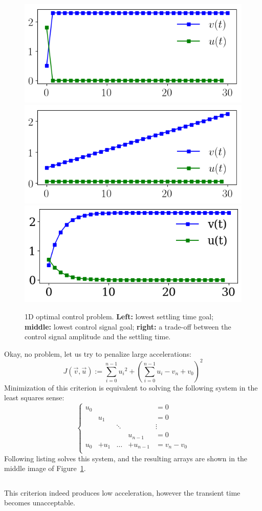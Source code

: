 \documentclass[notitlepage,oneside]{book}
\begin{document}
\begin{figure}[htb]
    \centering
    \includegraphics[width=.32\linewidth]{img/example_6_1_a.png}
    \includegraphics[width=.32\linewidth]{img/example_6_1_b.png}
    \includegraphics[width=.32\linewidth]{img/example_6_1_c.png}
    \caption{1D optimal control problem. \textbf{Left:} lowest settling time goal; \textbf{middle:} lowest control signal goal; \textbf{right:} a trade-off between the control signal amplitude and the settling time.}
    \label{fig:lqr}
\end{figure}

Okay, no problem, let us try to penalize large accelerations:
$$
J(\vec{v}, \vec{u}) := \sum\limits_{i=0}^{n-1} {u_i}^2 + \left(\sum\limits_{i=0}^{n-1} {u_i} - {v_n} + {v_0}\right)^2
$$
Minimization of this criterion is equivalent to solving the following system in the least squares sense:
$$
\left \{ \begin{array}{ccccl}
{u_0} &       &       &           & = 0 \\
              & {u_1} &       &           & = 0 \\
    &       &   \ddots    &     &      \vdots       \\
              &                 &       &   {u_{n-1}} & = 0 \\
{u_0} & + {u_1} & \dots & + {u_{n-1}} & = {v_n} - {v_0} \\
\end{array} \right.
$$
Following listing solves this system, and the resulting arrays are shown in the middle image of Figure~\ref{fig:lqr}.
\inputminted[frame=single,linenos=true]{python}{listings/example_6.1_b.py}
This criterion indeed produces low acceleration, however the transient time becomes unacceptable.

\vspace{2mm}
\end{document}
